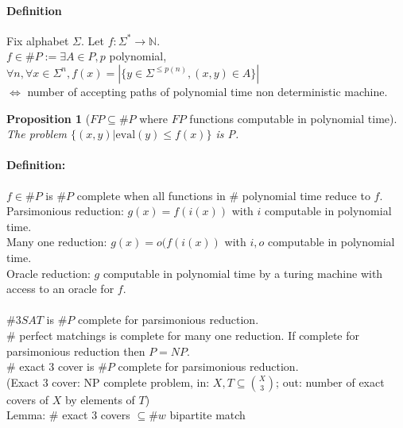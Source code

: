 \documentclass[12pt]{article}
\newtheorem{propo}{Proposition}
\begin{document}
\paragraph{Definition\\}
Fix alphabet $\Sigma$. Let $f : \Sigma^* \rightarrow \mathbb{N}$.\\
$f \in \#P := \exists A \in P, p$ polynomial, $\forall n, \forall x \in \Sigma^n, f(x) = |\lbrace y \in \Sigma^{\leq p(n)}, (x,y) \in A \rbrace|$\\
$\Leftrightarrow$ number of accepting paths of polynomial time non deterministic machine.\\

\begin{propo}[$FP \subseteq \#P$ where $FP$ functions computable in polynomial time]
The problem $\{ (x,y) | \mathrm{eval}(y) \leq f(x) \}$ is P.
\end{propo}

\paragraph{Definition:} $f \in \#P$ is $\#P$ complete when all functions in $\#$ polynomial time reduce to $f$.\\
Parsimonious reduction: $g(x) = f(i(x))$ with $i$ computable in polynomial time.\\
Many one reduction: $g(x) = o(f(i(x))$ with $i,o$ computable in polynomial time.\\
Oracle reduction: $g$ computable in polynomial time by a turing machine with access to an oracle for $f$.\\\\

$\#3SAT$ is $\#P$ complete for parsimonious reduction.\\
$\#$ perfect matchings is complete for many one reduction. If complete for parsimonious reduction then $P=NP$.\\
$\#$ exact 3 cover is $\#P$ complete for parsimonious reduction.\\
(Exact 3 cover: NP complete problem, in: $X, T \subseteq \binom{X}{3}$; out: number of exact covers of $X$ by elements of $T$)\\
Lemma: $\#$ exact 3 covers $\subseteq \#w$ bipartite match\\
\end{document}
